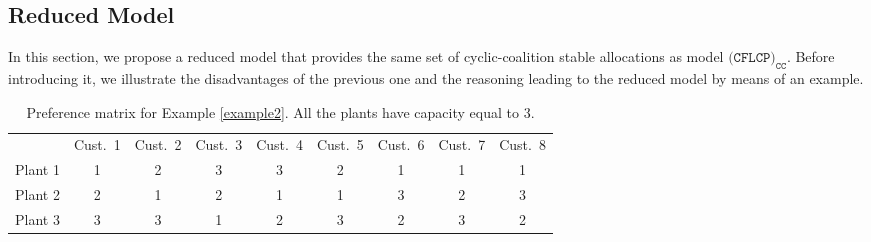 \documentclass[preprint,11pt,authoryear]{elsarticle}
\begin{document}
\subsection{Reduced Model}
In this section, we propose a reduced model that provides the same set of cyclic-coalition stable allocations as model $\texttt{(CFLCP)}_{\texttt{CC}}$. Before introducing it, we illustrate the disadvantages of the previous one and the reasoning leading to the reduced model by means of an example.


\begin{table}%
    \centering
    \begin{tabular}{ccccccccc}
    \toprule    
     & Cust.\ 1 & Cust.\ 2 & Cust.\ 3 & Cust.\ 4  & Cust.\ 5 & Cust.\ 6 & Cust.\ 7 & Cust.\ 8\\ \cmidrule(lr){2-9}
    Plant 1 & 1 &  2 & 3 & 3 & 2 &  1 & 1 & 1  \\ 
    Plant 2 & 2 &  1 & 2 & 1 & 1 &  3 & 2 & 3 \\ 
    Plant 3 & 3 &  3 & 1 & 2 & 3 &  2 & 3 & 2 \\
    \bottomrule
\end{tabular}
\caption{Preference matrix for Example \ref{example2}. All the plants have capacity equal to 3.} 
\label{tab:toyexample2}
\end{table}
\end{document}
